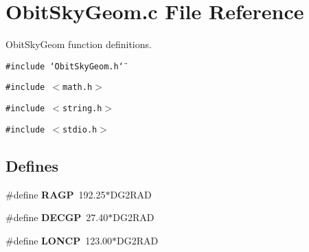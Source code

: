 \section{Obit\-Sky\-Geom.c File Reference}
\label{ObitSkyGeom_8c}
Obit\-Sky\-Geom function definitions. 

{\tt \#include \char`\"{}Obit\-Sky\-Geom.h\char`\"{}}\par
{\tt \#include $<$math.h$>$}\par
{\tt \#include $<$string.h$>$}\par
{\tt \#include $<$stdio.h$>$}\par
\subsection*{Defines}
\begin{CompactItemize}
\item 
\#define {\bf RAGP}\ 192.25$\ast$DG2RAD
\item 
\#define {\bf DECGP}\ 27.40$\ast$DG2RAD
\item 
\#define {\bf LONCP}\ 123.00$\ast$DG2RAD
\end{CompactItemize}
